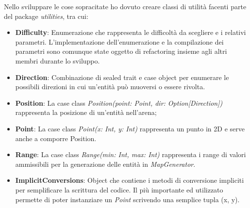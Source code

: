 Nello sviluppare le cose sopracitate ho dovuto creare classi di utilità facenti parte del package \textit{utilities}, tra cui:
\begin{itemize}
    \item \textbf{Difficulty}: Enumerazione che rappresenta le difficoltà da scegliere e i relativi parametri. L'implementazione dell'enumerazione e la compilazione dei parametri sono comunque state oggetto di refactoring insieme agli altri membri durante lo sviluppo.
    \item \textbf{Direction}: Combinazione di sealed trait e case object per enumerare le possibili direzioni in cui un'entità può muoversi o essere rivolta.
    \item \textbf{Position}: La case class \textit{Position(point: Point, dir: Option[Direction])} rappresenta la posizione di un'entità nell'arena;
    \item \textbf{Point}: La case class \textit{Point(x: Int, y: Int)} rappresenta un punto in 2D e serve anche a comporre Position.
    \item \textbf{Range}: La case class \textit{Range(min: Int, max: Int)} rappresenta i range di valori ammissibili per la generazione delle entità in \textit{MapGenerator}.
    \item \textbf{ImplicitConversions}: Object che contiene i metodi di conversione impliciti per semplificare la scrittura del codice. Il più importante ed utilizzato permette di poter instanziare un \textit{Point} scrivendo una semplice tupla (x, y).
\end{itemize}